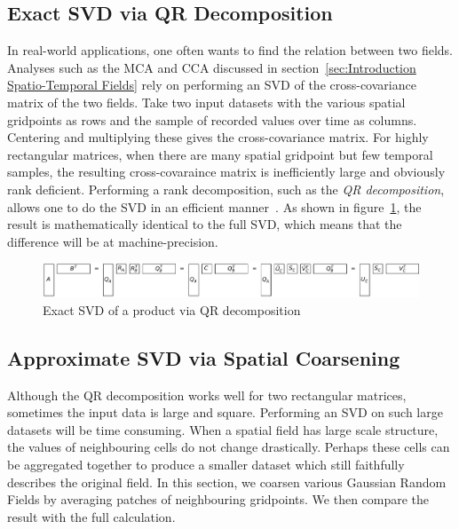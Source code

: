 \documentclass[sigconf]{acmart}
\begin{document}
\subsection{Exact SVD via QR Decomposition}
\label{sec:Techniques Exact SVD via QR Decomposition}

In real-world applications, one often wants to find the relation between two fields. Analyses such as the MCA and CCA discussed in section~\ref{sec:Introduction Spatio-Temporal Fields} rely on performing an SVD of the cross-covariance matrix of the two fields. Take two input datasets with the various spatial gridpoints as rows and the sample of recorded values over time as columns. Centering and multiplying these gives the cross-covariance matrix. For highly rectangular matrices, when there are many spatial gridpoint but few temporal samples, the resulting cross-covaraince matrix is inefficiently large and obviously rank deficient. Performing a rank decomposition, such as the \textit{QR decomposition}, allows one to do the SVD in an efficient manner~\cite{Chan1982, Tygert2017}. As shown in figure~\ref{fig:qrProductSVD}, the result is mathematically identical to the full SVD, which means that the difference will be at machine-precision.

\begin{figure}[h]
\begin{center}
\includegraphics[width=\columnwidth]{Results/qrProductSVD.pdf}
\caption[Exact SVD via QR decomposition]{Exact SVD of a product via QR decomposition}
\label{fig:qrProductSVD}
\end{center}
\end{figure}

\subsection{Approximate SVD via Spatial Coarsening}
\label{sec:Techniques Approximate SVD via Spatial Coarsening}

Although the QR decomposition works well for two rectangular matrices, sometimes the input data is large and square. Performing an SVD on such large datasets will be time consuming. When a spatial field has large scale structure, the values of neighbouring cells do not change drastically. Perhaps these cells can be aggregated together to produce a smaller dataset which still faithfully describes the original field. In this section, we coarsen various Gaussian Random Fields by averaging patches of neighbouring gridpoints. We then compare the result with the full calculation.
\end{document}
